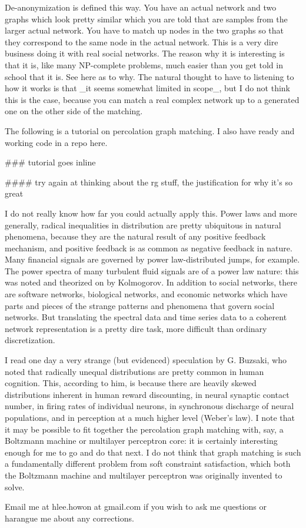 \documentclass[12pt]{article}
\begin{document}
De-anonymization is defined this way. You have an actual network and two graphs which look pretty similar which you are told that are samples from the larger actual network. You have to match up nodes in the two graphs so that they correspond to the same node in the actual network. This is a very dire business doing it with real social networks. The reason why it is interesting is that it is, like many NP-complete problems, much easier than you get told in school that it is. See here as to why. The natural thought to have to listening to how it works is that _it seems somewhat limited in scope_, but I do not think this is the case, because you can match a real complex network up to a generated one on the other side of the matching.

The following is a tutorial on percolation graph matching. I also have ready and working code in a repo here.

### tutorial goes inline

#### try again at thinking about the rg stuff, the justification for why it's so great

I do not really know how far you could actually apply this. Power laws and more generally, radical inequalities in distribution are pretty ubiquitous in natural phenomena, because they are the natural result of any positive feedback mechanism, and positive feedback is as common as negative feedback in nature. Many financial signals are governed by power law-distributed jumps, for example. The power spectra of many turbulent fluid signals are of a power law nature: this was noted and theorized on by Kolmogorov. In addition to social networks, there are software networks, biological networks, and economic networks which have parts and pieces of the strange patterns and phenomena that govern social networks. But translating the spectral data and time series data to a coherent network representation is a pretty dire task, more difficult than ordinary discretization.

I read one day a very strange (but evidenced) speculation by G. Buzsaki, who noted that radically unequal distributions are pretty common in human cognition. This, according to him, is because there are heavily skewed distributions inherent in human reward discounting, in neural synaptic contact number, in firing rates of individual neurons, in synchronous discharge of neural populations, and in perception at a much higher level (Weber's law). I note that it may be possible to fit together the percolation graph matching with, say, a Boltzmann machine or multilayer perceptron core: it is certainly interesting enough for me to go and do that next. I do not think that graph matching is such a fundamentally different problem from soft constraint satisfaction, which both the Boltzmann machine and multilayer perceptron was originally invented to solve.

Email me at hlee.howon at gmail.com if you wish to ask me questions or harangue me about any corrections.
\end{document}
